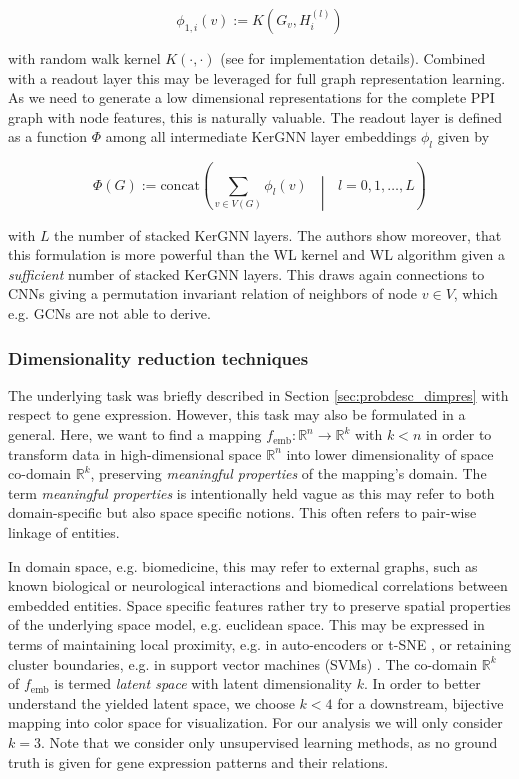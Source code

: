 \documentclass[]{article}
\renewcommand{\cite}{\citep}
\begin{document}
\begin{equation}
	\phi_{1,i}(v) := K\left(G_v, H_i^{(l)}\right)
\end{equation}

with random walk kernel $K(\cdot, \cdot)$ (see \citet{feng2022kergnns} for implementation details). Combined with a readout layer this may be leveraged for full graph representation learning. As we need to generate a low dimensional representations for the complete PPI graph with node features, this is naturally valuable. The readout layer is defined as a function $\Phi$ among all intermediate KerGNN layer embeddings $\phi_l$ given by 

\begin{equation}
	\label{equ:KerGNN}
	\Phi(G):= \text{concat}\left( \sum_{v\in V(G)} \phi_l(v) \text{ }\middle|\text{ } l=0,1,\dots, L \right)
\end{equation} 

with $L$ the number of stacked KerGNN layers. The authors show moreover, that this formulation is more powerful than the WL kernel and WL algorithm given a \textit{sufficient} number of stacked KerGNN layers. This draws again connections to CNNs giving a permutation invariant relation of neighbors of node $v\in V$, which e.g. GCNs are not able to derive. 


\subsubsection{Dimensionality reduction techniques}
\label{sec:dim_red}

The underlying task was briefly described in Section \ref{sec:probdesc_dimpres} with respect to gene expression. However, this task may also be formulated in a general. Here, we want to find a mapping $f_\text{emb}:\mathbb{R}^n\rightarrow \mathbb{R}^k$ with $k<n$ in order to transform data in high-dimensional space $\mathbb{R}^n$ into lower dimensionality of space co-domain $\mathbb{R}^k$, preserving \textit{meaningful properties} of the mapping's domain. The term \textit{meaningful properties} is intentionally held vague as this may refer to both domain-specific but also space specific notions. This often refers to pair-wise linkage of entities.

In domain space, e.g. biomedicine, this may refer to external graphs, such as known biological or neurological interactions and biomedical correlations between embedded entities. Space specific features rather try to preserve spatial properties of the underlying space model, e.g. euclidean space. This may be expressed in terms of maintaining local proximity, e.g. in auto-encoders \cite{ng2011sparse} or t-SNE \cite{van2008visualizing}, or retaining cluster boundaries, e.g. in support vector machines (SVMs) \cite{noble2006support}. The co-domain $\mathbb{R}^k$ of $f_\text{emb}$ is termed \textit{latent space} with latent dimensionality $k$.
In order to better understand the yielded latent space, we choose $k<4$ for a downstream, bijective mapping into color space for visualization. For our analysis we will only consider $k=3$. Note that we consider only unsupervised learning methods, as no ground truth is given for gene expression patterns and their relations.\\
\end{document}
